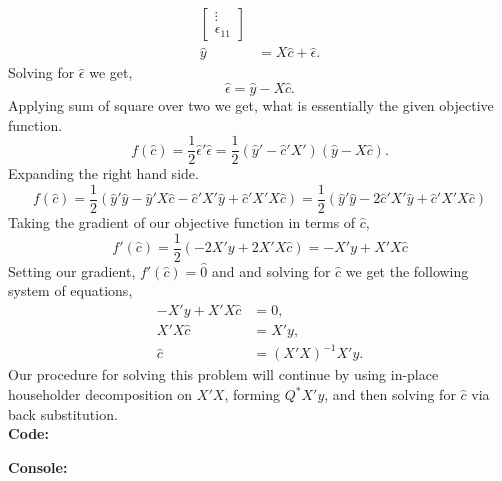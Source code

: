 \documentclass[12pt]{article}
\makeatletter
\theoremstyle{homework}
\newenvironment{exercise}[1]
{\def\@currentlabel{#1}\exercisecore}
{\endexercisecore}
\makeatother
\begin{document}
\begin{exercise}{Problem P1}
\begin{exercise}{Problem P2}
\begin{align*}
\begin{bmatrix}
          \vdots \\
          \epsilon_{11}
        \end{bmatrix}\\
        \hat{y} &= X\hat{c} + \hat{\epsilon}.
    \end{align*}    
    Solving for $\hat{\epsilon}$ we get, 
    \begin{equation*}
      \hat{\epsilon} = \hat{y} - X\hat{c}.
    \end{equation*}
    Applying sum of square over two we get, what is essentially the given objective function. 
    \begin{equation*}
      f(\hat{c}) = \frac{1}{2}\hat{\epsilon}'\hat{\epsilon} = \frac{1}{2}(\hat{y}' - \hat{c}'X')(\hat{y} - X\hat{c}).
    \end{equation*}
    Expanding the right hand side. 
    \begin{equation*}
      f(\hat{c}) =  \frac{1}{2}(\hat{y}'\hat{y} - \hat{y}'X\hat{c}  - \hat{c}'X'\hat{y} + \hat{c}'X'X\hat{c}) = \frac{1}{2}(\hat{y}'\hat{y} - 2\hat{c}'X'\hat{y} + \hat{c}'X'X\hat{c})
    \end{equation*}
    Taking the gradient of our objective function in terms of $\hat{c}$,
    \begin{equation*}
      f'(\hat{c}) = \frac{1}{2}(-2X'y + 2X'X\hat{c}) = -X'y + X'X\hat{c}
    \end{equation*}
    Setting our gradient, $f'(\hat{c}) = \hat{0}$ and and solving for $\hat{c}$ we get the following system of equations, 
    \begin{align*}
    -X'y + X'X\hat{c} &= 0,\\
    X'X\hat{c} &= X'y,\\
    \hat{c} &= (X'X)^{-1}X'y.
    \end{align*}
    Our procedure for solving this problem will continue by using in-place householder decomposition on $X'X$, forming $Q^*X'y$, and then solving for 
    $\hat{c}$ via back substitution. \\

    \textbf{Code:}
    \begin{center}
      
    \end{center}
    \textbf{Console:}
    \begin{center}
      
    \end{center}
    \vspace{.15in}


\end{exercise}
\end{exercise}
\end{document}
